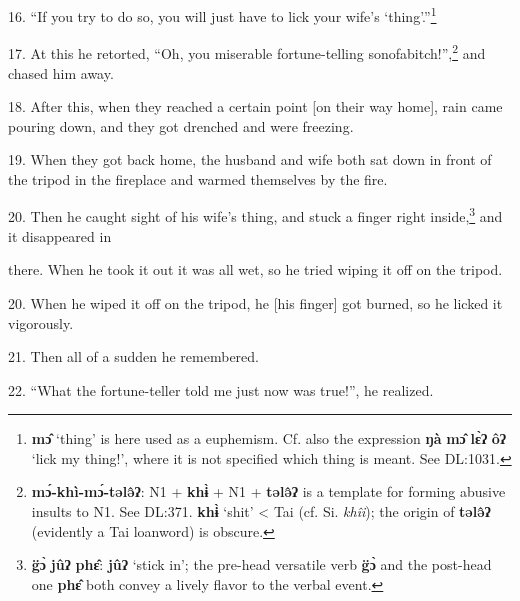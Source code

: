16. ``If you try to do so, you will just have to lick your wife's `thing'.''\footnote{\textbf{mɔ̂} `thing' is here used as a euphemism. Cf. also the expression \textbf{ŋà} \textbf{mɔ̂} \textbf{lɛ̀ʔ} \textbf{ôʔ} `lick my thing!', where it is not specified which thing is meant. See DL:1031.}

17. At this he retorted, ``Oh, you miserable fortune-telling sonofabitch!'',\footnote{\textbf{mɔ́-khì-mɔ́-tələ̂ʔ}: N1 + \textbf{khɨ̀} + N1 +\textbf{ tələ̂ʔ} is a template for forming abusive insults to N1. See DL:371. \textbf{khɨ̀} `shit' < Tai (cf. Si. \textit{khîi}); the origin of \textbf{tələ̂ʔ} (evidently a Tai loanword) is obscure.}
and chased him away.

18. After this, when they reached a certain point [on their way home], rain came
pouring down, and they got drenched and were freezing.

19. When they got back home, the husband and wife both sat down in front of the
tripod in the fireplace and warmed themselves by the fire.

20. Then he caught sight of his wife's thing, and stuck a finger right inside,\footnote{\textbf{g̈ɔ̀} \textbf{jûʔ} \textbf{phɛ̂}: \textbf{jûʔ} `stick in'; the pre-head versatile verb \textbf{g̈ɔ̀} and the post-head one \textbf{phɛ̂} both convey a lively flavor to the verbal event.}
and it disappeared in

there. When he took it out it was all wet, so he tried wiping it off on the tripod.

20. When he wiped it off on the tripod, he [his finger] got burned, so he licked
it vigorously.

21. Then all of a sudden he remembered.

22. ``What the fortune-teller told me just now was true!'', he realized.


